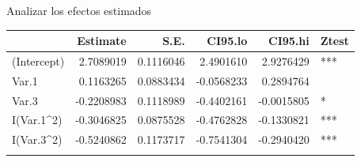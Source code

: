 \documentclass[
  11pt,
  ignorenonframetext,
]{beamer}
\newenvironment{Shaded}{}{}
\newcommand{\DecValTok}[1]{\textcolor[rgb]{0.25,0.63,0.44}{#1}}
\newcommand{\FunctionTok}[1]{\textcolor[rgb]{0.02,0.16,0.49}{#1}}
\newcommand{\NormalTok}[1]{#1}
\newcommand{\OtherTok}[1]{\textcolor[rgb]{0.00,0.44,0.13}{#1}}
\newcommand{\SpecialCharTok}[1]{\textcolor[rgb]{0.25,0.44,0.63}{#1}}
\begin{document}
\begin{frame}[fragile]{Analizar los efectos estimados}
\protect\hypertarget{analizar-los-efectos-estimados}{}
\begin{Shaded}
\end{Shaded}

\begin{longtable}[]{@{}lrrrrl@{}}
\toprule\noalign{}
& Estimate & S.E. & CI95.lo & CI95.hi & Ztest \\
\midrule\noalign{}
\endhead
(Intercept) & 2.7089019 & 0.1116046 & 2.4901610 & 2.9276429 & *** \\
Var.1 & 0.1163265 & 0.0883434 & -0.0568233 & 0.2894764 & \\
Var.3 & -0.2208983 & 0.1118989 & -0.4402161 & -0.0015805 & * \\
I(Var.1\^{}2) & -0.3046825 & 0.0875528 & -0.4762828 & -0.1330821 &
*** \\
I(Var.3\^{}2) & -0.5240862 & 0.1173717 & -0.7541304 & -0.2940420 &
*** \\
\bottomrule\noalign{}
\end{longtable}
\end{frame}
\end{document}
